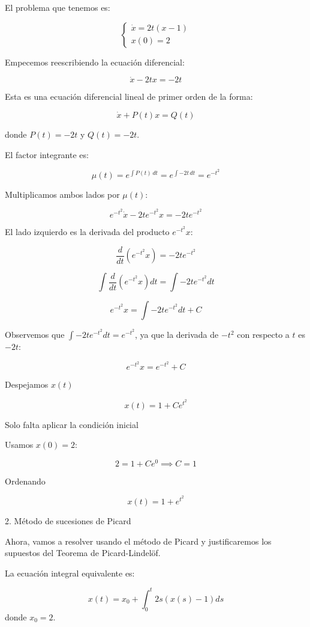 \documentclass{article}
\theoremstyle{nonumberplain}
\begin{document}
El problema que tenemos es:

\[
\left\{
\begin{array}{l}
\dot{x} = 2t(x-1) \\
x(0) = 2
\end{array}
\right.
\]

Empecemos reescribiendo la ecuación diferencial:

\[
\dot{x} - 2t x = -2t
\]

Esta es una ecuación diferencial lineal de primer orden de la forma:

\[
\dot{x} + P(t)x = Q(t)
\]

donde \( P(t) = -2t \) y \( Q(t) = -2t \).


El factor integrante es:

\[
\mu(t) = e^{\int P(t)\,dt} = e^{\int -2t\,dt} = e^{-t^2}
\]


Multiplicamos ambos lados por \(\mu(t)\):

\[
e^{-t^2}\dot{x} - 2t e^{-t^2} x = -2t e^{-t^2}
\]

El lado izquierdo es la derivada del producto \(e^{-t^2}x\):

\[
\frac{d}{dt}\left(e^{-t^2} x\right) = -2t e^{-t^2}
\]


\[
\int \frac{d}{dt}\left(e^{-t^2} x\right) dt = \int -2t e^{-t^2} dt
\]

\[
e^{-t^2} x = \int -2t e^{-t^2} dt + C
\]

Observemos que \(\int -2t e^{-t^2} dt = e^{-t^2}\), ya que la derivada de \(-t^2\) con respecto a \(t\) es \(-2t\):

\[
e^{-t^2} x = e^{-t^2} + C
\]

 Despejamos \(x(t)\)

\[
x(t) = 1 + C e^{t^2}
\]

 Solo falta aplicar la condición inicial

Usamos \(x(0) = 2\):

\[
2 = 1 + C e^{0}
\implies C = 1
\]

Ordenando

\[
x(t) = 1 + e^{t^2}
\]

2. Método de sucesiones de Picard

Ahora, vamos a resolver usando el método de Picard y justificaremos los supuestos del Teorema de Picard-Lindelöf.

La ecuación integral equivalente es:

\[
x(t) = x_0 + \int_{0}^{t} 2s(x(s)-1) ds
\]
donde \(x_0 = 2\). \\
\end{document}

